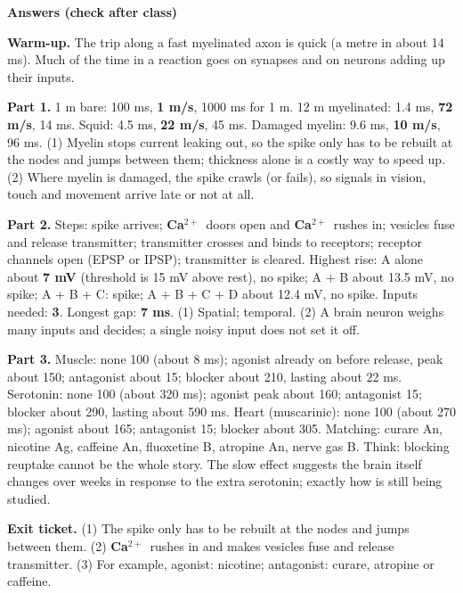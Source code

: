 \documentclass[12pt,a4paper]{article}
\newcommand{\pagehead}[1]{{\color{kprimary}\LARGE\bfseries #1}\par\vspace{2pt}{\color{kaccent}\rule{\linewidth}{1.2pt}}\par\vspace{4pt}}
\newcommand{\Ca}{\textcolor{cCa}{\textbf{Ca$^{2+}$}}}
\begin{document}
\newpage
\pagehead{Answers (check after class)}

\textbf{Warm-up.} The trip along a fast myelinated axon is quick (a metre in about 14 ms). Much of the time in a reaction goes on synapses and on neurons adding up their inputs.

\textbf{Part 1.} 1 \textmu m bare: 100 ms, \textbf{1 m/s}, 1000 ms for 1 m. 12 \textmu m myelinated: 1.4 ms, \textbf{72 m/s}, 14 ms. Squid: 4.5 ms, \textbf{22 m/s}, 45 ms. Damaged myelin: 9.6 ms, \textbf{10 m/s}, 96 ms. (1) Myelin stops current leaking out, so the spike only has to be rebuilt at the nodes and jumps between them; thickness alone is a costly way to speed up. (2) Where myelin is damaged, the spike crawls (or fails), so signals in vision, touch and movement arrive late or not at all.

\textbf{Part 2.} Steps: spike arrives; \Ca\ doors open and \Ca\ rushes in; vesicles fuse and release transmitter; transmitter crosses and binds to receptors; receptor channels open (EPSP or IPSP); transmitter is cleared. Highest rise: A alone about \textbf{7 mV} (threshold is 15 mV above rest), no spike; A + B about 13.5 mV, no spike; A + B + C: spike; A + B + C + D about 12.4 mV, no spike. Inputs needed: \textbf{3}. Longest gap: \textbf{7 ms}. (1) Spatial; temporal. (2) A brain neuron weighs many inputs and decides; a single noisy input does not set it off.

\textbf{Part 3.} Muscle: none 100 (about 8 ms); agonist already on before release, peak about 150; antagonist about 15; blocker about 210, lasting about 22 ms. Serotonin: none 100 (about 320 ms); agonist peak about 160; antagonist 15; blocker about 290, lasting about 590 ms. Heart (muscarinic): none 100 (about 270 ms); agonist about 165; antagonist 15; blocker about 305. Matching: curare An, nicotine Ag, caffeine An, fluoxetine B, atropine An, nerve gas B. Think: blocking reuptake cannot be the whole story. The slow effect suggests the brain itself changes over weeks in response to the extra serotonin; exactly how is still being studied.

\textbf{Exit ticket.} (1) The spike only has to be rebuilt at the nodes and jumps between them. (2) \Ca\ rushes in and makes vesicles fuse and release transmitter. (3) For example, agonist: nicotine; antagonist: curare, atropine or caffeine.
\end{document}
